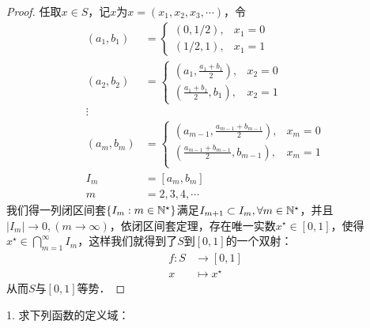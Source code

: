 \begin{proof}
任取$x \in S$，记$x$为$x = (x_1,x_2,x_3,\cdots)$，令
\begin{align}
    (a_1, b_1) &= \begin{cases}
        (0, 1/2), & x_1 = 0 \\
        (1/2, 1), & x_1 = 1
    \end{cases} \\
    (a_2, b_2) &= \begin{cases}
        (a_1, \displaystyle\frac{a_1+b_1}{2}), & x_2 = 0 \\
        (\displaystyle\frac{a_1+b_1}{2}, b_1), & x_2 = 1
    \end{cases} \\
    \vdots \\
    (a_m, b_m) &= \begin{cases}
        (a_{m-1}, \displaystyle\frac{a_{m-1}+b_{m-1}}{2}), & x_m = 0 \\
        (\displaystyle\frac{a_{m-1}+b_{m-1}}{2}, b_{m-1}), & x_m = 1 \\
    \end{cases} \\
    I_m &= [a_m, b_m] \\
    m &= 2,3,4,\cdots 
\end{align}
我们得一列闭区间套$\{ I_m: m \in \mathbb{N}^\star \}$满足$I_{m+1} \subset I_m, \forall m \in \mathbb{N}^\star$，并且$|I_m| \to 0, (m \to \infty)$，依闭区间套定理，存在唯一实数$x^\star \in [0, 1]$，使得$x^\star \in \displaystyle\bigcap_{m=1}^\infty I_m$，这样我们就得到了$S$到$[0,1]$的一个双射：
\begin{align}
    f: S &\longrightarrow [0,1] \\
    x &\longmapsto x^\star
\end{align}
从而$S$与$[0,1]$等势．
\end{proof}

\exercise

1. 求下列函数的定义域：

